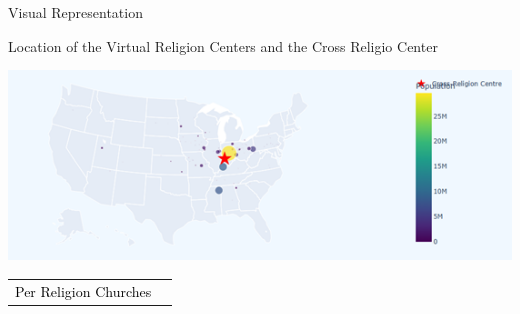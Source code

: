 \documentclass[12pt]{beamer}
\begin{document}
\begin{frame}{Visual Representation}


Location of the Virtual Religion Centers and the Cross Religio Center 
\begin{center}
    \includegraphics[width=0.8\linewidth, height=0.6\textheight, keepaspectratio]{Star.png}
    
    \vspace{1em}
    \begin{tabular}{ll}
      \textcolor{black}{Per Religion Churches
 }\\

    \end{tabular}
\end{center}

\end{frame}
\end{document}
